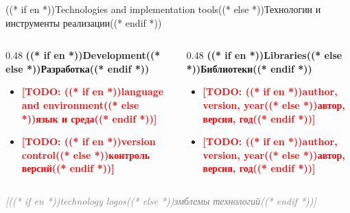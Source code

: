 \documentclass[aspectratio=169, 14pt]{beamer}
\newcommand{\todo}[1]{\textcolor{red}{\textbf{[TODO: #1]}}}
\begin{document}
\begin{frame}{((* if en *))Technologies and implementation tools((* else *))Технологии и инструменты реализации((* endif *))}
  \begin{columns}[T]
    \begin{column}{0.48\textwidth}
      {\color{hseblue}\textbf{((* if en *))Development((* else *))Разработка((* endif *))}}
      \begin{itemize}
        \item \todo{((* if en *))language and environment((* else *))язык и среда((* endif *))}
        \item \todo{((* if en *))version control((* else *))контроль версий((* endif *))}
      \end{itemize}
    \end{column}
    \begin{column}{0.48\textwidth}
      {\color{hseblue}\textbf{((* if en *))Libraries((* else *))Библиотеки((* endif *))}}
      \begin{itemize}
        \item \todo{((* if en *))author, version, year((* else *))автор, версия, год((* endif *))}
        \item \todo{((* if en *))author, version, year((* else *))автор, версия, год((* endif *))}
      \end{itemize}
    \end{column}
  \end{columns}

  \vspace{0.4em}
  \begin{center}
    \textcolor{gray}{\itshape [((* if en *))technology logos((* else *))эмблемы технологий((* endif *))]}
  \end{center}
\end{frame}
\end{document}
